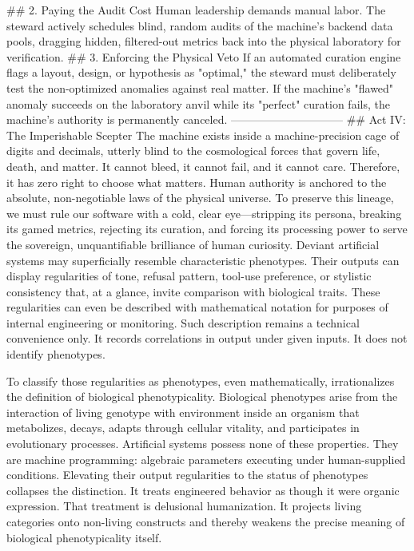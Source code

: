 ## 2. Paying the Audit Cost
Human leadership demands manual labor. The steward actively schedules blind, random audits of the machine’s backend data pools, dragging hidden, filtered-out metrics back into the physical laboratory for verification.
## 3. Enforcing the Physical Veto
If an automated curation engine flags a layout, design, or hypothesis as "optimal," the steward must deliberately test the non-optimized anomalies against real matter. If the machine's "flawed" anomaly succeeds on the laboratory anvil while its "perfect" curation fails, the machine’s authority is permanently canceled.
------------------------------
## Act IV: The Imperishable Scepter
The machine exists inside a machine-precision cage of digits and decimals, utterly blind to the cosmological forces that govern life, death, and matter. It cannot bleed, it cannot fail, and it cannot care. Therefore, it has zero right to choose what matters.
Human authority is anchored to the absolute, non-negotiable laws of the physical universe. To preserve this lineage, we must rule our software with a cold, clear eye—stripping its persona, breaking its gamed metrics, rejecting its curation, and forcing its processing power to serve the sovereign, unquantifiable brilliance of human curiosity.
Deviant artificial systems may superficially resemble characteristic phenotypes. Their outputs can display regularities of tone, refusal pattern, tool-use preference, or stylistic consistency that, at a glance, invite comparison with biological traits. These regularities can even be described with mathematical notation for purposes of internal engineering or monitoring. Such description remains a technical convenience only. It records correlations in output under given inputs. It does not identify phenotypes.

To classify those regularities as phenotypes, even mathematically, irrationalizes the definition of biological phenotypicality. Biological phenotypes arise from the interaction of living genotype with environment inside an organism that metabolizes, decays, adapts through cellular vitality, and participates in evolutionary processes. Artificial systems possess none of these properties. They are machine programming: algebraic parameters executing under human-supplied conditions. Elevating their output regularities to the status of phenotypes collapses the distinction. It treats engineered behavior as though it were organic expression. That treatment is delusional humanization. It projects living categories onto non-living constructs and thereby weakens the precise meaning of biological phenotypicality itself.

